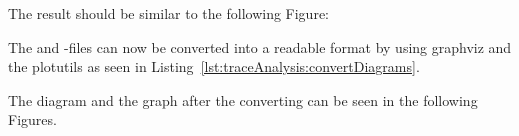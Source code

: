 \setBashListing


The result should be similar to the following Figure:
\begin{figure}[H]
\begin{graybox}
\end{graybox}
\end{figure}
The  and -files can now be converted into a readable format by using graphviz and the plotutils as seen in Listing~\ref{lst:traceAnalysis:convertDiagrams}.

The diagram and the graph after the converting can be seen in the following Figures.

